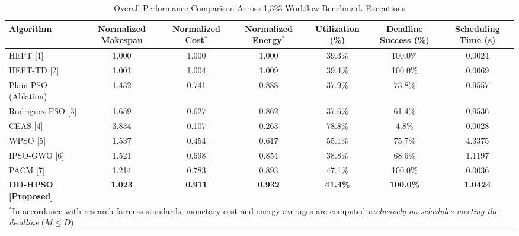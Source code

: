\documentclass[journal]{IEEEtran}
\begin{document}
\begin{table}[t]
\centering
\caption{Overall Performance Comparison Across 1,323 Workflow Benchmark Executions}
\label{tab:comprehensive_results}
\begin{tabular}{lcccccc}
\toprule
\textbf{Algorithm} & \textbf{Normalized Makespan} & \textbf{Normalized Cost$^*$} & \textbf{Normalized Energy$^*$} & \textbf{Utilization (\%)} & \textbf{Deadline Success (\%)} & \textbf{Scheduling Time (s)} \\
\midrule
HEFT [1] & 1.000 & 1.000 & 1.000 & 39.3\% & 100.0\% & 0.0024 \\
HEFT-TD [2] & 1.001 & 1.004 & 1.009 & 39.4\% & 100.0\% & 0.0069 \\
Plain PSO (Ablation) & 1.432 & 0.741 & 0.888 & 37.9\% & 73.8\% & 0.9557 \\
Rodriguez PSO [3] & 1.659 & 0.627 & 0.862 & 37.6\% & 61.4\% & 0.9536 \\
CEAS [4] & 3.834 & 0.107 & 0.263 & 78.8\% & 4.8\% & 0.0028 \\
WPSO [5] & 1.537 & 0.454 & 0.617 & 55.1\% & 75.7\% & 4.3375 \\
IPSO-GWO [6] & 1.521 & 0.698 & 0.854 & 38.8\% & 68.6\% & 1.1197 \\
PACM [7] & 1.214 & 0.783 & 0.893 & 47.1\% & 100.0\% & 0.0036 \\
\midrule
\textbf{DD-HPSO [Proposed]} & \textbf{1.023} & \textbf{0.911} & \textbf{0.932} & \textbf{41.4\%} & \textbf{100.0\%} & \textbf{1.0424} \\
\bottomrule
\multicolumn{7}{l}{\footnotesize $^*$In accordance with research fairness standards, monetary cost and energy averages are computed \textit{exclusively on schedules meeting the deadline} ($M \le D$).}
\end{tabular}
\end{table}
\end{document}
